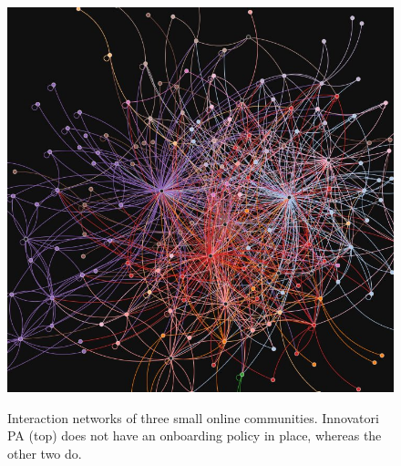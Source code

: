 \begin{figure}
	\includegraphics[width=.9\linewidth]{../Pictures/matera2019_01.jpg}\label{fig:MT2019Net}
  \caption{Interaction networks of three small online communities. Innovatori PA (top) does not have an onboarding policy in place, whereas the other two do. } 
 \label{fig:NetViz}
\end{figure}


